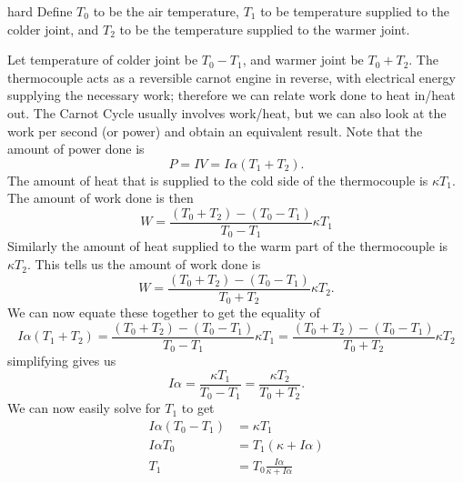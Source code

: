 \begin{solution}{hard}
Define $T_0$ to be the air temperature, $T_1$ to be temperature supplied to the colder joint, and $T_2$ to be the temperature supplied to the warmer joint. 
\vspace{3mm}

Let temperature of colder joint be $T_0 - T_1$, and warmer joint be $T_0 + T_2$. The thermocouple acts as a reversible carnot engine in reverse, with electrical energy supplying the necessary work; therefore we can relate work done to heat in/heat out. The Carnot Cycle usually involves work/heat, but we can also look at the work per second (or power) and obtain an equivalent result. Note that the amount of power done is 
\[P = IV = I\alpha (T_1 + T_2).\]
The amount of heat that is supplied to the cold side of the thermocouple is $\kappa T_1$. The amount of work done is then 
\[W = \frac{(T_0+T_2) - (T_0-T_1)}{T_0-T_1} \kappa T_1\]
Similarly the amount of heat supplied to the warm part of the thermocouple is $\kappa T_2$. This tells us the amount of work done is 
\[W = \frac{(T_0+T_2) - (T_0-T_1)}{T_0+T_2} \kappa T_2.\]
We can now equate these together to get the equality of 
\[I\alpha (T_1 + T_2) = \frac{(T_0+T_2) - (T_0-T_1)}{T_0-T_1} \kappa T_1 = \frac{(T_0+T_2) - (T_0-T_1)}{T_0+T_2} \kappa T_2\]
simplifying gives us 
\[I\alpha = \frac{\kappa T_1}{T_0 - T_1} = \frac{\kappa T_2}{T_0 + T_2}.\]
We can now easily solve for $T_1$ to get 
\begin{align*}
I\alpha (T_0 - T_1) &= \kappa T_1\\
I\alpha T_0 &= T_1 (\kappa + I\alpha)\\
T_1 &= \boxed{T_0\frac{I\alpha}{\kappa + I\alpha}}
\end{align*}
\end{solution}